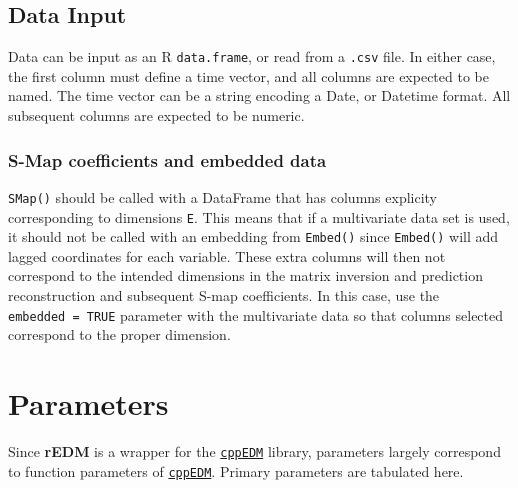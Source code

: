 \documentclass[]{article}
\begin{document}
\hypertarget{data-input}{%
\subsection{Data Input}\label{data-input}}

Data can be input as an R \texttt{data.frame}, or read from a
\texttt{.csv} file. In either case, the first column must define a time
vector, and all columns are expected to be named. The time vector can be
a string encoding a Date, or Datetime format. All subsequent columns are
expected to be numeric.

\hypertarget{s-map-coefficients-and-embedded-data}{%
\subsubsection{S-Map coefficients and embedded
data}\label{s-map-coefficients-and-embedded-data}}

\texttt{SMap()} should be called with a DataFrame that has columns
explicity corresponding to dimensions \texttt{E}. This means that if a
multivariate data set is used, it should not be called with an embedding
from \texttt{Embed()} since \texttt{Embed()} will add lagged coordinates
for each variable. These extra columns will then not correspond to the
intended dimensions in the matrix inversion and prediction
reconstruction and subsequent S-map coefficients. In this case, use the
\texttt{embedded\ =\ TRUE} parameter with the multivariate data so that
columns selected correspond to the proper dimension.

\hypertarget{parameters}{%
\section{Parameters}\label{parameters}}

Since \textbf{rEDM} is a wrapper for the
\href{github.com/SugiharaLab/cppEDM}{\texttt{cppEDM}} library,
parameters largely correspond to function parameters of
\href{github.com/SugiharaLab/cppEDM}{\texttt{cppEDM}}. Primary
parameters are tabulated here.
\end{document}
